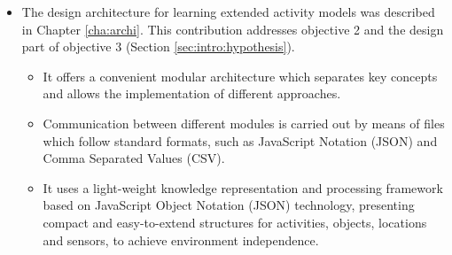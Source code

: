  \begin{itemize}
 \item The design architecture for learning extended activity models was described in Chapter \ref{cha:archi}. This contribution addresses objective 2 and the design part of objective 3 (Section \ref{sec:intro:hypothesis}).
 \begin{itemize}
  \item It offers a convenient modular architecture which separates key concepts and allows the implementation of different approaches.
  \item Communication between different modules is carried out by means of files which follow standard formats, such as JavaScript Notation (JSON) and Comma Separated Values (CSV). 
  \item It uses a light-weight knowledge representation and processing framework based on JavaScript Object Notation (JSON) technology, presenting compact and easy-to-extend structures for activities, objects, locations and sensors, to achieve environment independence.
 \end{itemize}


\end{itemize}
